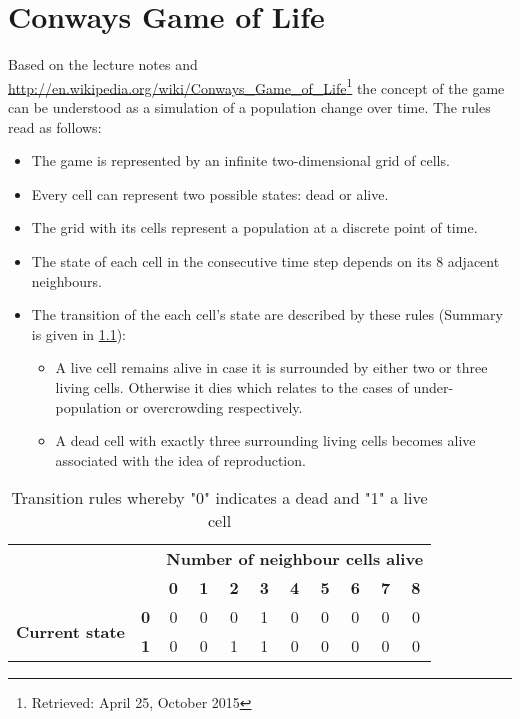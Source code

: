 \chapter{Conways Game of Life}

Based on the lecture notes and \url{http://en.wikipedia.org/wiki/Conways_Game_of_Life}\footnote{Retrieved: April 25, October 2015} the concept of the game can be understood as a simulation of a population change over time. The rules read as follows:
\begin{itemize}
	\item The game is represented by an infinite two-dimensional grid of cells.
	\item Every cell can represent two possible states: dead or alive.
	\item The grid with its cells represent a population at a discrete point of time.
	\item The state of each cell in the consecutive time step depends on its 8 adjacent neighbours.
	\item The transition of the each cell's state are described by these rules (Summary is given in \cref{table:rules}):
	\begin{itemize}
		\item A live cell remains alive in case it is surrounded by either two or three living cells. Otherwise it dies which relates to the cases of under-population or overcrowding respectively.
		\item A dead cell with exactly three surrounding living cells becomes alive associated with the idea of reproduction.
	\end{itemize}
\end{itemize}

\begin{table}[h]\centering
	\begin{tabular}{c c | c c c c c c c c c} \hline\hline
		& & \multicolumn{9}{c}{\bf Number of neighbour cells alive} \\
		& & \bf 0 & \bf 1 & \bf 2 & \bf 3 & \bf 4 & \bf 5 & \bf 6 & \bf 7 & \bf 8 \\ \hline
		\multirow{2}{*}{\bf Current state} & \bf 0 & 0 & 0 & 0 & 1 & 0 & 0 & 0 & 0 & 0 \\
		& \bf 1 & 0 & 0 & 1 & 1 & 0 & 0 & 0 & 0 & 0 \\
		\hline\hline
	\end{tabular}
	\caption[Transition rules]{Transition rules whereby "0" indicates a dead and "1" a live cell}
	\label{table:rules}
\end{table}


